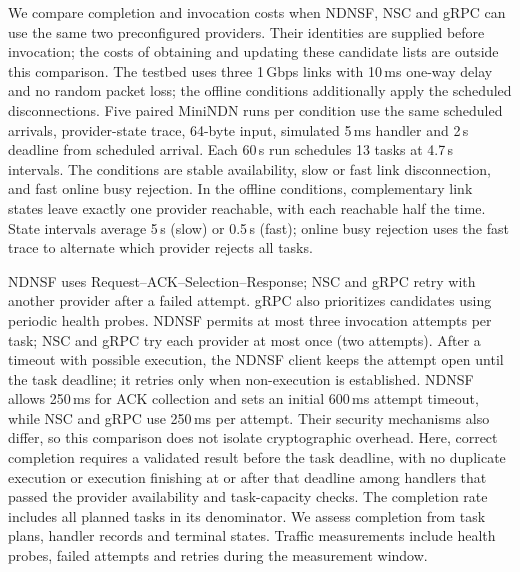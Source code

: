 We compare completion and invocation costs when NDNSF, NSC and gRPC can use the same two preconfigured providers. Their identities are supplied before invocation; the costs of obtaining and updating these candidate lists are outside this comparison. The testbed uses three 1\,Gbps links with 10\,ms one-way delay and no random packet loss; the offline conditions additionally apply the scheduled disconnections. Five paired MiniNDN runs per condition use the same scheduled arrivals, provider-state trace, 64-byte input, simulated 5\,ms handler and 2\,s deadline from scheduled arrival. Each 60\,s run schedules 13 tasks at 4.7\,s intervals. The conditions are stable availability, slow or fast link disconnection, and fast online busy rejection. In the offline conditions, complementary link states leave exactly one provider reachable, with each reachable half the time. State intervals average 5\,s (slow) or 0.5\,s (fast); online busy rejection uses the fast trace to alternate which provider rejects all tasks.

NDNSF uses Request--ACK--Selection--Response; NSC and gRPC retry with another provider after a failed attempt. gRPC also prioritizes candidates using periodic health probes. NDNSF permits at most three invocation attempts per task; NSC and gRPC try each provider at most once (two attempts). After a timeout with possible execution, the NDNSF client keeps the attempt open until the task deadline; it retries only when non-execution is established. NDNSF allows 250\,ms for ACK collection and sets an initial 600\,ms attempt timeout, while NSC and gRPC use 250\,ms per attempt. Their security mechanisms also differ, so this comparison does not isolate cryptographic overhead. Here, correct completion requires a validated result before the task deadline, with no duplicate execution or execution finishing at or after that deadline among handlers that passed the provider availability and task-capacity checks. The completion rate includes all planned tasks in its denominator. We assess completion from task plans, handler records and terminal states. Traffic measurements include health probes, failed attempts and retries during the measurement window.

